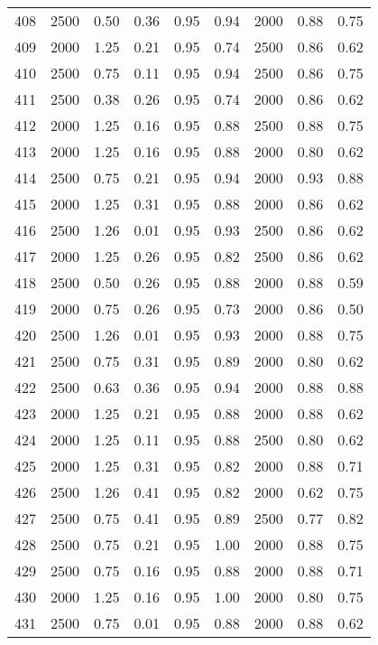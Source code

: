 \begin{longtable}[c]{ccccccccc}
408 &  2500 &  0.50 &  0.36 &  0.95 &  0.94 &  2000 &  0.88 &  0.75 \\
409 &  2000 &  1.25 &  0.21 &  0.95 &  0.74 &  2500 &  0.86 &  0.62 \\
410 &  2500 &  0.75 &  0.11 &  0.95 &  0.94 &  2500 &  0.86 &  0.75 \\
411 &  2500 &  0.38 &  0.26 &  0.95 &  0.74 &  2000 &  0.86 &  0.62 \\
412 &  2000 &  1.25 &  0.16 &  0.95 &  0.88 &  2500 &  0.88 &  0.75 \\
413 &  2000 &  1.25 &  0.16 &  0.95 &  0.88 &  2000 &  0.80 &  0.62 \\
414 &  2500 &  0.75 &  0.21 &  0.95 &  0.94 &  2000 &  0.93 &  0.88 \\
415 &  2000 &  1.25 &  0.31 &  0.95 &  0.88 &  2000 &  0.86 &  0.62 \\
416 &  2500 &  1.26 &  0.01 &  0.95 &  0.93 &  2500 &  0.86 &  0.62 \\
417 &  2000 &  1.25 &  0.26 &  0.95 &  0.82 &  2500 &  0.86 &  0.62 \\
418 &  2500 &  0.50 &  0.26 &  0.95 &  0.88 &  2000 &  0.88 &  0.59 \\
419 &  2000 &  0.75 &  0.26 &  0.95 &  0.73 &  2000 &  0.86 &  0.50 \\
420 &  2500 &  1.26 &  0.01 &  0.95 &  0.93 &  2000 &  0.88 &  0.75 \\
421 &  2500 &  0.75 &  0.31 &  0.95 &  0.89 &  2000 &  0.80 &  0.62 \\
422 &  2500 &  0.63 &  0.36 &  0.95 &  0.94 &  2000 &  0.88 &  0.88 \\
423 &  2000 &  1.25 &  0.21 &  0.95 &  0.88 &  2000 &  0.88 &  0.62 \\
424 &  2000 &  1.25 &  0.11 &  0.95 &  0.88 &  2500 &  0.80 &  0.62 \\
425 &  2000 &  1.25 &  0.31 &  0.95 &  0.82 &  2000 &  0.88 &  0.71 \\
426 &  2500 &  1.26 &  0.41 &  0.95 &  0.82 &  2000 &  0.62 &  0.75 \\
427 &  2500 &  0.75 &  0.41 &  0.95 &  0.89 &  2500 &  0.77 &  0.82 \\
428 &  2500 &  0.75 &  0.21 &  0.95 &  1.00 &  2000 &  0.88 &  0.75 \\
429 &  2500 &  0.75 &  0.16 &  0.95 &  0.88 &  2000 &  0.88 &  0.71 \\
430 &  2000 &  1.25 &  0.16 &  0.95 &  1.00 &  2000 &  0.80 &  0.75 \\
431 &  2500 &  0.75 &  0.01 &  0.95 &  0.88 &  2000 &  0.88 &  0.62 \\

\end{longtable}
